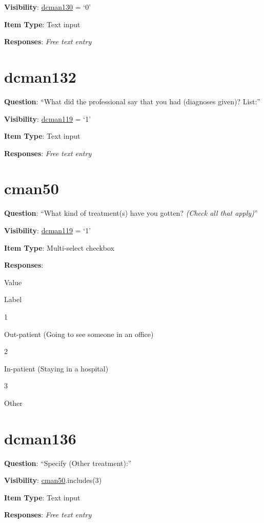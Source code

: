 \documentclass[]{book}
\begin{document}
\textbf{Visibility}: \protect\hyperlink{dcman130}{dcman130} = `0'

\textbf{Item Type}: Text input

\textbf{Responses}: \emph{Free text entry}

\hypertarget{dcman132}{%
\section{dcman132}\label{dcman132}}

\textbf{Question}: ``What did the professional say that you had (diagnoses given)? List:''

\textbf{Visibility}: \protect\hyperlink{dcman119}{dcman119} = `1'

\textbf{Item Type}: Text input

\textbf{Responses}: \emph{Free text entry}

\hypertarget{cman50}{%
\section{cman50}\label{cman50}}

\textbf{Question}: ``What kind of treatment(s) have you gotten? \emph{(Check all that apply)}''

\textbf{Visibility}: \protect\hyperlink{dcman119}{dcman119} = `1'

\textbf{Item Type}: Multi-select checkbox

\textbf{Responses}:

Value

Label

1

Out-patient (Going to see someone in an office)

2

In-patient (Staying in a hospital)

3

Other

\hypertarget{dcman136}{%
\section{dcman136}\label{dcman136}}

\textbf{Question}: ``Specify (Other treatment):''

\textbf{Visibility}: \protect\hyperlink{cman50}{cman50}.includes(3)

\textbf{Item Type}: Text input

\textbf{Responses}: \emph{Free text entry}
\end{document}
